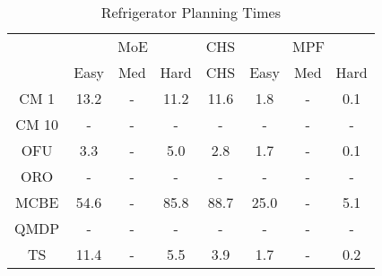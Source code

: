 \begin{table}[]
\centering
\begin{tabular}{|c|c|c|c|c|c|c|c|}
\hline
& \multicolumn{3}{c|}{MoE} & CHS & \multicolumn{3}{c|}{MPF} 
 \\ 
 & Easy & Med & Hard & CHS & Easy & Med & Hard\\\hline
CM 1 &  13.2 & - &  11.2 &  11.6 &   1.8 & - &   0.1\\
\hline
CM 10 & - & - & - & - & - & - & -\\
\hline
OFU &   3.3 & - &   5.0 &   2.8 &   1.7 & - &   0.1\\
\hline
ORO & - & - & - & - & - & - & -\\
\hline
MCBE &  54.6 & - &  85.8 &  88.7 &  25.0 & - &   5.1\\
\hline
QMDP & - & - & - & - & - & - & -\\
\hline
TS &  11.4 & - &   5.5 &   3.9 &   1.7 & - &   0.2\\
\hline
\end{tabular}
\caption{Refrigerator Planning Times}
\label{tab:experiment_Refrigerator_time}
\end{table}
